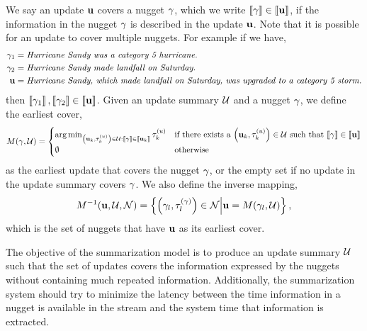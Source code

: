 We say an update $\mathbf{u}$ covers a nugget $\gamma$, which we write $\left\llbracket \gamma \right\rrbracket \in \left\llbracket \mathbf{u} \right\rrbracket$, if the information
in the nugget $\gamma$ is described in the update $\mathbf{u}$. Note
that it is possible for an update to cover multiple nuggets.
For example if we have,
\begin{align*}
    \gamma_1 & =  \textit{Hurricane Sandy was a category 5 hurricane.}\\
\gamma_2 & = \textit{Hurricane Sandy made landfall on Saturday.}\\
\mathbf{u} & = \textit{Hurricane Sandy, which made landfall on Saturday,
                was upgraded to a category 5 storm.}
\end{align*}
then $\left\llbracket \gamma_1 \right\rrbracket,\left\llbracket \gamma_2 \right\rrbracket \in
\left\llbracket \mathbf{u} \right\rrbracket$. Given an update summary $\mathcal{U}$ and a nugget
$\gamma$, we define the earliest cover, \[M(\gamma,
\mathcal{U}) = \begin{cases} \operatorname*{arg\,min}_{\left(\mathbf{u}_k,\tau^{(u)}_k\right) \in \mathcal{U} :
\left\llbracket \gamma \right\rrbracket \in \left\llbracket \mathbf{u}_k \right\rrbracket} \tau^{(u)}_k &
\textrm{if there exists a $\left(\mathbf{u}_k,\tau^{(u)}_k\right) \in \mathcal{U}$ such that
$\left\llbracket \gamma \right\rrbracket \in \left\llbracket \mathbf{u} \right\rrbracket$} \\ \emptyset &
\textrm{otherwise} \end{cases}\] as the earliest update that covers the nugget
$\gamma$, or the empty set if no update in the update summary covers
$\gamma$. We also define the inverse mapping,
\[M^{-1}(\mathbf{u}, \mathcal{U}, \mathcal{N}) =
\left\{\left(\gamma_l, \tau^{(\gamma)}_l\right)\in \mathcal{N} \Big\vert \mathbf{u} = M(\gamma_l,
\mathcal{U}) \right\},\] which is the set of nuggets that have $\mathbf{u}$
as its earliest cover.



The objective of the summarization model is to produce an update summary
$\mathcal{U}$ such that the set of updates covers the information expressed
by the nuggets without containing much repeated information. Additionally,
the summarization system should try to minimize the latency between 
the time information in a nugget is available in the stream and the system
time that information is extracted. 

